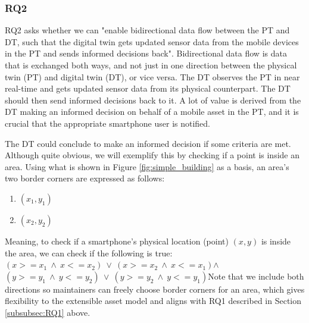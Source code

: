 \documentclass{article}
\begin{document}
\subsubsection{RQ2}\label{subsubsec:RQ2}
RQ2 asks whether we can "enable bidirectional data flow between the PT and DT, such that the digital twin gets updated sensor data from the mobile devices in the PT and sends informed decisions back". Bidirectional data flow is data that is exchanged both ways, and not just in one direction between the physical twin (PT) and digital twin (DT), or vice versa. The DT observes the PT in near real-time and gets updated sensor data from its physical counterpart. The DT should then send informed decisions back to it. A lot of value is derived from the DT making an informed decision on behalf of a mobile asset in the PT, and it is crucial that the appropriate smartphone user is notified.

The DT could conclude to make an informed decision if some criteria are met. Although quite obvious, we will exemplify this by checking if a point is inside an area. Using what is shown in Figure \ref{fig:simple_building} as a basis, an area's two border corners are expressed as follows:
\begin{enumerate}
    \item $(x_1, y_1)$
    \item $(x_2, y_2)$
\end{enumerate}
Meaning, to check if a smartphone's physical location (point) $(x, y)$ is inside the area, we can check if the following is true:\newline\newline$(x >= x_1\:\land\: x <= x_2)\:\lor\:(x >= x_2\:\land\:x <= x_1)$\newline$\land$\newline$(y >= y_1\:\land\:y <= y_2)\:\lor\:(y >= y_2\:\land\:y <= y_1)$\newline\newline Note that we include both directions so maintainers can freely choose border corners for an area, which gives flexibility to the extensible asset model and aligns with RQ1 described in Section \ref{subsubsec:RQ1} above.
\end{document}

